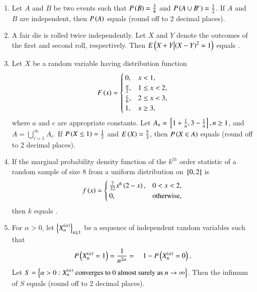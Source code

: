 \documentclass[journal]{IEEEtran}
\begin{document}
\begin{enumerate} 
\item Let $A$ and $B$ be two events such that $P\left(B\right) = \frac{3}{4}$ and $P\left(A \cup B^c\right) = \frac{1}{2}$. If $A$ and $B$ are independent, then $P\left(A\right)$ equals \underline{\hspace{1cm}} (round off to 2 decimal places).

\item A fair die is rolled twice independently. Let $X$ and $Y$ denote the outcomes of the first and second roll, respectively. Then $E \left(X + Y\middle|\left(X - Y\right)^2 = 1\right)$ equals \underline{\hspace{1cm}}.

\item Let $X$ be a random variable having distribution function
\begin{align*}
F\left(x\right) = 
\begin{cases}
0, & x < 1, \\
\frac{a}{2}, & 1 \leq x < 2, \\
\frac{c}{6}, & 2 \leq x < 3, \\
1, & x \geq 3,
\end{cases}
\end{align*}
where $a$ and $c$ are appropriate constants. Let $A_n = {}\left[ 1 + \frac{1}{n}, 3 - \frac{1}{n} \right], n \geq 1$, and $A = \bigcup_{i=1}^{\infty} A_i$.
If $P\left(X \leq 1\right) = \frac{1}{2}$ and $E\left(X\right) = \frac{5}{3}$, then $P\left(X \in A\right)$ equals \underline{\hspace{1cm}} (round off to 2 decimal places).

\item If the marginal probability density function of the $k^{th}$ order statistic of a random sample of size 8 from a uniform distribution on ${}\left[0,2\right]$ is
\begin{align*}
f\left(x\right) = 
\begin{cases}
\frac{7}{32} x^6 \left(2 - x\right), & 0 < x < 2, \\
0, & \text{otherwise},
\end{cases}
\end{align*}
then $k$ equals \underline{\hspace{1cm}}.

\item For $\alpha > 0$, let $\left\{ X_n^{\left(\alpha\right)} \right\}_{n\geq1}$ be a sequence of independent random variables such that
\begin{align*}
P\left(X_n^{\left(\alpha\right)} = 1\right) = \frac{1}{n^{2\alpha}} = \quad 1 - P\left(X_n^{\left(\alpha\right)} = 0\right).
\end{align*}
Let $S = \left\{ \alpha > 0 : X_n^{\left(\alpha\right)} \text{ converges to 0 almost surely as } n \to \infty \right\}$.
Then the infimum of $S$ equals \underline{\hspace{1cm}} (round off to 2 decimal places).


\end{enumerate}
\end{document}
